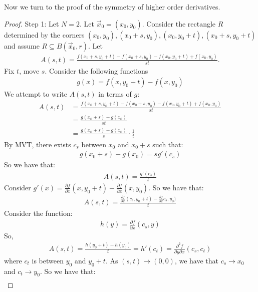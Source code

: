 \documentclass{report}
\begin{document}
\newpage 
\noindent Now we turn to the proof of the symmetry of higher order derivatives.
\begin{proof}
    Step 1: Let $N = 2$. Let $\vec{x}_0 = (x_0, y_0)$. Consider the rectangle $R$ determined by the corners $(x_0, y_0), (x_0 + s, y_0), (x_0, y_0 + t), (x_0 + s, y_0 + t)$ and assume $R \subseteq B(\vec{x}_0, r)$. Let 
    \begin{align*}
        A(s, t) = \frac{f(x_0 + s, y_0 + t) - f(x_0 + s, y_0) - f(x_0, y_0 + t) + f(x_0, y_0)}{st}.
    \end{align*}
    Fix $t$, move $s$. Consider the following functions
    \begin{align*}
        g(x) = f(x, y_0 + t) - f(x, y_0)
    \end{align*}
    We attempt to write $A(s, t)$ in terms of $g$:
    \begin{align*}
        A(s, t) &= \frac{f(x_0 + s, y_0 + t) - f(x_0 + s, y_0) - f(x_0, y_0 + t) + f(x_0, y_0)}{st} \\
        &= \frac{g(x_0 + s) - g(x_0)}{st} \\
        &= \frac{g(x_0 + s) - g(x_0)}{s} \cdot \frac{1}{t}
    \end{align*}
    By MVT, there exists $c_s$ between $x_0$ and $x_0 + s$ such that:
    \begin{align*}
        g(x_0 + s) - g(x_0) = sg'(c_s)
    \end{align*}
    So we have that:
    \begin{align*}
        A(s, t) = \frac{g'(c_s)}{t}
    \end{align*}
    Consider $g'(x) = \frac{\partial f}{\partial x}(x, y_0 + t) - \frac{\partial f}{\partial x}(x, y_0)$. So we have that:
    \begin{align*}
        A(s, t) = \frac{ \frac{\partial f}{\partial x}(c_s, y_0 + t) -  \frac{\partial f}{\partial x}c_s, y_0) }{t}
    \end{align*}
    Consider the function:
    \begin{align*}
        h(y) = \frac{\partial f}{\partial x}(c_s, y)
    \end{align*}
    So, 
    \begin{align*}
        A(s, t) = \frac{h(y_0 + t) - h(y_0)}{t} = h'(c_t) = \frac{\partial^2 f}{\partial y \partial x}(c_s, c_t)
    \end{align*}
    where $c_t$ is between $y_0$ and $y_0 + t$. As $(s,t) \to (0, 0)$, we have that $c_s \to x_0$ and $c_t \to y_0$. So we have that:
    \begin{align*}

\end{align*}
\end{proof}
\end{document}
